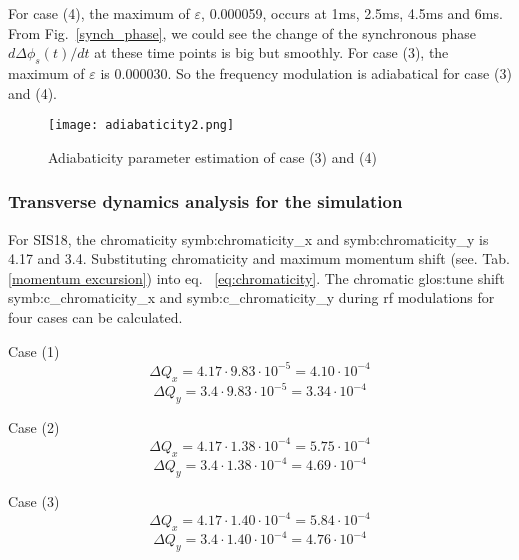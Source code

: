 \begin{itemize}
For case (4), the maximum of $\varepsilon$, 0.000059, occurs at 1ms, 2.5ms, 4.5ms and 6ms. From Fig.~\ref{synch_phase}, we could see the change of the synchronous phase $d\Delta \phi_s(t)/dt$ at these time points is big but smoothly. For case (3), the maximum of $\varepsilon$ is 0.000030. So the frequency modulation is adiabatical for case (3) and (4).


\begin{figure}[H]
   \centering   
   \texttt{[image: adiabaticity2.png]}
   \caption{Adiabaticity parameter estimation of case (3) and (4)}
   \label{adiabaticity2}
\end{figure}
\end{itemize}
\subsubsection{Transverse dynamics analysis for the simulation}
For SIS18, the chromaticity \gls{symb:chromaticity_x} and \gls{symb:chromaticity_y} is 4.17 and 3.4. Substituting chromaticity and maximum momentum shift (see. Tab. \ref{momentum excursion}) into eq. ~\ref{eq:chromaticity}. The chromatic \gls{glos:tune} shift \gls{symb:c_chromaticity_x} and \gls{symb:c_chromaticity_y} during rf modulations for four cases can be calculated. 

Case (1) 
\begin{equation}
\Delta Q_x = 4.17 \cdot 9.83 \cdot 10^{-5}=4.10 \cdot 10^{-4}
\end{equation}
\begin{equation}
\Delta Q_y = 3.4 \cdot 9.83 \cdot 10^{-5}=3.34 \cdot 10^{-4} 
\end{equation}

Case (2)
\begin{equation}
\Delta Q_x = 4.17 \cdot 1.38 \cdot 10^{-4}=5.75 \cdot 10^{-4}
\end{equation}
\begin{equation}
\Delta Q_y = 3.4 \cdot 1.38 \cdot 10^{-4}=4.69 \cdot 10^{-4} 
\end{equation}

Case (3)
\begin{equation}
\Delta Q_x = 4.17 \cdot 1.40 \cdot 10^{-4}=5.84 \cdot 10^{-4}
\end{equation}
\begin{equation}
\Delta Q_y = 3.4 \cdot 1.40 \cdot 10^{-4}=4.76 \cdot 10^{-4} 
\end{equation}


